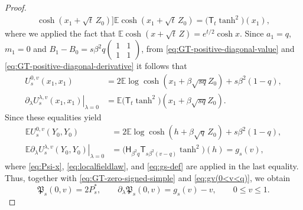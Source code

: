 \documentclass[11pt]{article}
\numberwithin{equation}{section}
\newcommand{\E}{\mathbb{E}}
\newcommand{\1}{\mathbf 1}
\begin{document}
\begin{proof}
\begin{align}
{                \cosh(x_1 +\sqrt t\,Z_0 )]}
         {\E\cosh(x_1 +\sqrt t\,Z_0 )}
 =\bigl(\mathsf T_t\tanh^2\bigr)(x_1) , \label{eq:GT-positive-diagonal-derivative}
\end{align}
where we applied the fact that $\E\cosh(x+\sqrt t\,Z)=e^{t/2}\cosh x$.
Since $a_1 = q$, $m_1 = 0$ and $B_1 - B_0 = s\beta ^2 q \left( \begin{array}{cc} 1&1\\ 1&1 \end{array}\right)$, from \eqref{eq:GT-positive-diagonal-value} and \eqref{eq:GT-positive-diagonal-derivative} it follows that
\begin{align*}
U_s^{0,v}(x_1 ,x_1) &= 2 \E \log\cosh (x_1 + \beta \sqrt{sq} Z_0) +s\beta^2(1-q) , \\
%
\left.\partial_\lambda U_s^{\lambda,v}(x_1,x_1) \right|_{\lambda=0} &= \E \bigl(\mathsf T_t\tanh^2\bigr)(x_1 + \beta \sqrt{sq} Z_0) .
\end{align*}
Since these equalities yield
\begin{align*}
 \E U_s^{0,v}(Y_0,Y_0) & = 2\E\log\cosh(h+\beta\sqrt q\,Z_0)+s\beta^2(1-q) , \\
 \E\left. \partial_\lambda U_s^{\lambda,v}(Y_0,Y_0) \right|_{\lambda=0}&= \bigl(\mathsf H_{\beta^2q} \mathsf T_{s\beta^2(v-q)}\tanh^2\bigr)(h)
 =g_s(v),
\end{align*}
where \eqref{eq:Psi-x}, \eqref{eq:localfieldlaw}, and \eqref{eq:gs-def} are applied in the last equality.
Thus, together with \eqref{eq:GT-zero-signed-simple} and \eqref{eq:gv(0<v<q)}, we obtain
\begin{equation}
 \mathfrak P_s(0,v)=2P_s^*,
 \qquad
 \partial_\lambda\mathfrak P_s(0,v)=g_s(v)-v,
 \qquad 0\le v\le1.
 \label{eq:GT-zero-positive-simple}
\end{equation}


\end{proof}
\end{document}
